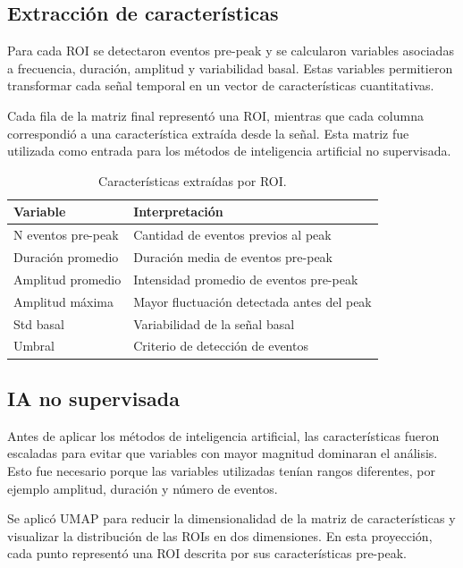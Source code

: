 \documentclass[10pt,twocolumn]{article}
\begin{document}
\subsection{Extracción de características}

Para cada ROI se detectaron eventos pre-peak y se calcularon variables asociadas a frecuencia, duración, amplitud y variabilidad basal. Estas variables permitieron transformar cada señal temporal en un vector de características cuantitativas.

Cada fila de la matriz final representó una ROI, mientras que cada columna correspondió a una característica extraída desde la señal. Esta matriz fue utilizada como entrada para los métodos de inteligencia artificial no supervisada.

\begin{table}[H]
\centering
\caption{Características extraídas por ROI.}
\begin{tabular}{p{3.1cm}p{3.1cm}}
\toprule
\textbf{Variable} & \textbf{Interpretación} \\
\midrule
N eventos pre-peak & Cantidad de eventos previos al peak \\
Duración promedio & Duración media de eventos pre-peak \\
Amplitud promedio & Intensidad promedio de eventos pre-peak \\
Amplitud máxima & Mayor fluctuación detectada antes del peak \\
Std basal & Variabilidad de la señal basal \\
Umbral & Criterio de detección de eventos \\
\bottomrule
\end{tabular}
\end{table}

\subsection{IA no supervisada}

Antes de aplicar los métodos de inteligencia artificial, las características fueron escaladas para evitar que variables con mayor magnitud dominaran el análisis. Esto fue necesario porque las variables utilizadas tenían rangos diferentes, por ejemplo amplitud, duración y número de eventos.

Se aplicó UMAP para reducir la dimensionalidad de la matriz de características y visualizar la distribución de las ROIs en dos dimensiones. En esta proyección, cada punto representó una ROI descrita por sus características pre-peak.
\end{document}
